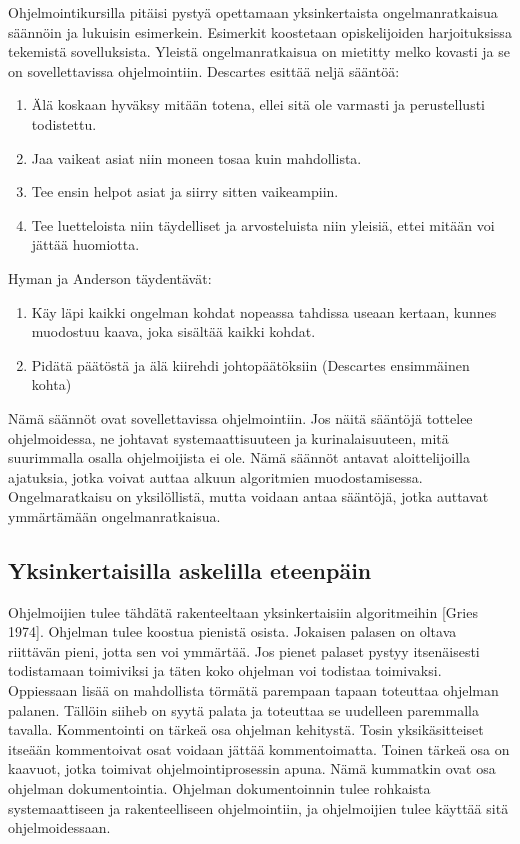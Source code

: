 \documentclass[a4paper]{article}
\begin{document}
Ohjelmointikursilla pitäisi pystyä opettamaan yksinkertaista ongelmanratkaisua säännöin ja lukuisin esimerkein. Esimerkit koostetaan opiskelijoiden harjoituksissa tekemistä sovelluksista. Yleistä ongelmanratkaisua on mietitty melko kovasti ja se on sovellettavissa ohjelmointiin. Descartes esittää neljä sääntöä:

\begin{enumerate}
  \item Älä koskaan hyväksy mitään totena, ellei sitä ole varmasti ja perustellusti todistettu.
  \item Jaa vaikeat asiat niin moneen tosaa kuin mahdollista.
  \item Tee ensin helpot asiat ja siirry sitten vaikeampiin.
  \item Tee luetteloista niin täydelliset ja arvosteluista niin yleisiä, ettei mitään voi jättää huomiotta.
\end{enumerate}

Hyman ja Anderson täydentävät:

\begin{enumerate}
  \item Käy läpi kaikki ongelman kohdat nopeassa tahdissa useaan kertaan, kunnes muodostuu kaava, joka sisältää kaikki kohdat.
  \item Pidätä päätöstä ja älä kiirehdi johtopäätöksiin (Descartes ensimmäinen kohta)
\end{enumerate}

Nämä säännöt ovat sovellettavissa ohjelmointiin. Jos näitä sääntöjä tottelee ohjelmoidessa, ne johtavat systemaattisuuteen ja kurinalaisuuteen, mitä suurimmalla osalla ohjelmoijista ei ole. Nämä säännöt antavat aloittelijoilla ajatuksia, jotka voivat auttaa alkuun algoritmien muodostamisessa. Ongelmaratkaisu on yksilöllistä, mutta voidaan antaa sääntöjä, jotka auttavat ymmärtämään ongelmanratkaisua.

\subsection{Yksinkertaisilla askelilla eteenpäin}

Ohjelmoijien tulee tähdätä rakenteeltaan yksinkertaisiin algoritmeihin [Gries 1974]. Ohjelman tulee koostua pienistä osista. Jokaisen palasen on oltava riittävän pieni, jotta sen voi ymmärtää. Jos pienet palaset pystyy itsenäisesti todistamaan toimiviksi ja täten koko ohjelman voi todistaa toimivaksi. Oppiessaan lisää on mahdollista törmätä parempaan tapaan toteuttaa ohjelman palanen. Tällöin siiheb on syytä palata ja toteuttaa se uudelleen paremmalla tavalla. Kommentointi on tärkeä osa ohjelman kehitystä. Tosin yksikäsitteiset itseään kommentoivat osat voidaan jättää kommentoimatta. Toinen tärkeä osa on kaavuot, jotka toimivat ohjelmointiprosessin apuna. Nämä kummatkin ovat osa ohjelman dokumentointia. Ohjelman dokumentoinnin tulee rohkaista systemaattiseen ja rakenteelliseen ohjelmointiin, ja ohjelmoijien tulee käyttää sitä ohjelmoidessaan.
\end{document}
